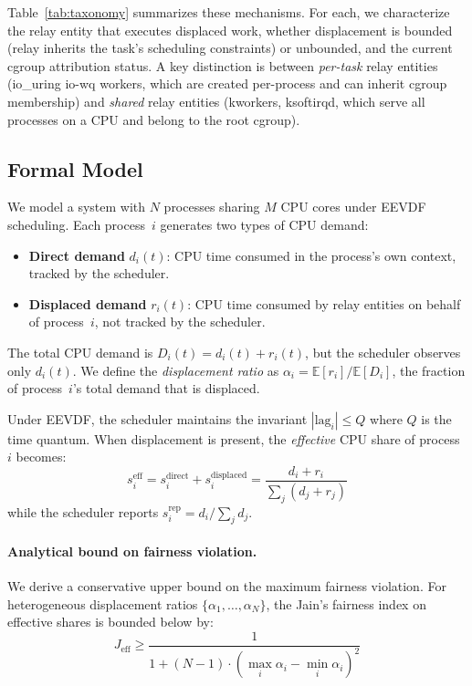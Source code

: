 \documentclass{article}
\newcommand{\displacement}{\alpha}
\newcommand{\jeff}{J_{\mathrm{eff}}}
\begin{document}
Table~\ref{tab:taxonomy} summarizes these mechanisms. For each, we characterize the relay entity that executes displaced work, whether displacement is bounded (relay inherits the task's scheduling constraints) or unbounded, and the current cgroup attribution status. A key distinction is between \emph{per-task} relay entities (io\_uring io-wq workers, which are created per-process and can inherit cgroup membership) and \emph{shared} relay entities (kworkers, ksoftirqd, which serve all processes on a CPU and belong to the root cgroup).

\subsection{Formal Model}

We model a system with $N$ processes sharing $M$ CPU cores under EEVDF scheduling. Each process~$i$ generates two types of CPU demand:
\begin{itemize}
    \item \textbf{Direct demand} $d_i(t)$: CPU time consumed in the process's own context, tracked by the scheduler.
    \item \textbf{Displaced demand} $r_i(t)$: CPU time consumed by relay entities on behalf of process~$i$, not tracked by the scheduler.
\end{itemize}

The total CPU demand is $D_i(t) = d_i(t) + r_i(t)$, but the scheduler observes only $d_i(t)$. We define the \emph{displacement ratio} as $\displacement_i = \mathbb{E}[r_i] / \mathbb{E}[D_i]$, the fraction of process~$i$'s total demand that is displaced.

Under EEVDF, the scheduler maintains the invariant $|\mathrm{lag}_i| \leq Q$ where $Q$ is the time quantum. When displacement is present, the \emph{effective} CPU share of process~$i$ becomes:
\begin{equation}
    s_i^{\mathrm{eff}} = s_i^{\mathrm{direct}} + s_i^{\mathrm{displaced}} = \frac{d_i + r_i}{\sum_j (d_j + r_j)}
\end{equation}
while the scheduler reports $s_i^{\mathrm{rep}} = d_i / \sum_j d_j$.

\paragraph{Analytical bound on fairness violation.}
We derive a conservative upper bound on the maximum fairness violation. For heterogeneous displacement ratios $\{\displacement_1, \ldots, \displacement_N\}$, the Jain's fairness index on effective shares is bounded below by:
\begin{equation}
    \jeff \geq \frac{1}{1 + (N-1) \cdot (\max_i \displacement_i - \min_i \displacement_i)^2}
    \label{eq:bound}
\end{equation}
\end{document}
